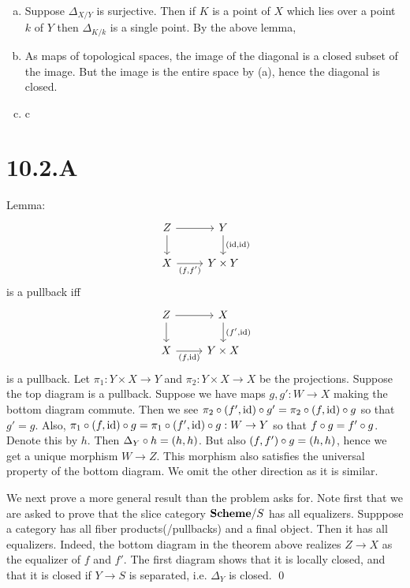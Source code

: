 \documentclass{article}
\begin{document}
\begin{enumerate}[a.]
    \item Suppose $\Delta_{X/Y}$ is surjective. Then if $K$ is a
          point of $X$ which lies over a point $k$ of
          $Y$ then $\Delta_{K/k}$ is a single point. By the
          above lemma,
    \item As maps of topological spaces, the image of the diagonal is a closed subset of
          the image. But the image is the entire space by (a), hence the diagonal is
          closed.
    \item c
\end{enumerate}

\section{10.2.A}
Lemma: \[\begin{tikzcd}
        Z & Y           \\
        X & {Y\times Y}
        \arrow["{(\operatorname{id}, \operatorname{id})}", from=1-2, to=2-2]
        \arrow[from=1-1, to=2-1]
        \arrow["{(f, f')}"', from=2-1, to=2-2]
        \arrow[from=1-1, to=1-2]
    \end{tikzcd}\] is a pullback iff	\[\begin{tikzcd}
        Z & X           \\
        X & {Y\times X}
        \arrow["{(f', \operatorname{id})}", from=1-2, to=2-2]
        \arrow[from=1-1, to=2-1]
        \arrow["{(f, \operatorname{id})}"', from=2-1, to=2-2]
        \arrow[from=1-1, to=1-2]
    \end{tikzcd}\]
is a pullback. Let $\pi_1: Y \times X \to Y$ and $\pi_2: Y \times X \to X$ be the
projections. Suppose the top diagram is a pullback. Suppose we have maps
$g, g': W \to X$ making the bottom diagram commute. Then we see
$\pi_2 \circ (f', \operatorname{id}) \circ g' = \pi_2 \circ (f, \operatorname{id}) \circ g$ so that $g'=g$. Also,
$\pi_1 \circ (f,\operatorname{id}) \circ g = \pi_1 \circ (f',\operatorname{id}) \circ g:
    W \to Y$ so that $f \circ g = f' \circ g$. Denote this by
$h$. Then $\Delta_Y \circ h=(h, h)$. But also
$(f, f') \circ g = (h, h)$, hence we get a unique morphism $W \to Z$.
This morphism also satisfies the universal property of the bottom diagram. We
omit the other direction as it is similar.

We next prove a more general result than the problem asks for. Note first that
we are asked to prove that the slice category $\mathbf{Scheme}/S$ has all
equalizers. Supppose a category has all fiber products(/pullbacks) and a final
object. Then it has all equalizers. Indeed, the bottom diagram in the theorem
above realizes $Z \to X$ as the equalizer of
$f$ and $f'$. The first diagram shows that
it is locally closed, and that it is closed if $Y \to S$ is
separated, i.e. $\Delta_Y$ is closed. \qed
\end{document}
